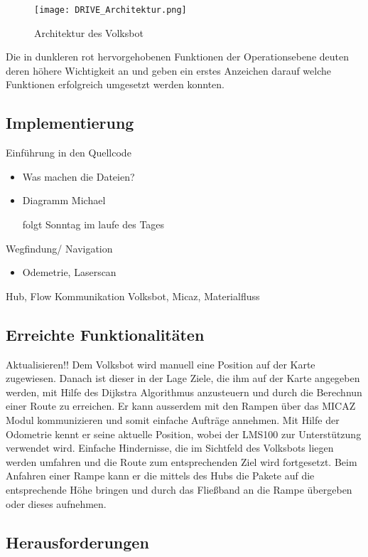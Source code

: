 \begin{figure}[h!]
 \centering
		\texttt{[image: DRIVE\_Architektur.png]}
	\caption{Architektur des Volksbot}
	\label{fig:architecture_volksbot}
\end{figure}

Die in dunkleren rot hervorgehobenen Funktionen der Operationsebene deuten deren höhere Wichtigkeit an und geben ein erstes Anzeichen darauf welche Funktionen erfolgreich umgesetzt werden konnten.

\subsection{Implementierung}
Einführung in den Quellcode
\begin{itemize}
\item Was machen die Dateien? 
\item Diagramm Michael

folgt Sonntag im laufe des Tages


\end{itemize}
Wegfindung/ Navigation
\begin{itemize}
\item Odemetrie, Laserscan
\end{itemize}
Hub, Flow
Kommunikation Volksbot, Micaz, Materialfluss

\subsection{Erreichte Funktionalitäten}

Aktualisieren!!
Dem Volksbot wird manuell eine Position auf der Karte zugewiesen. Danach ist dieser in der Lage Ziele, die ihm auf der Karte angegeben werden, mit Hilfe des Dijkstra Algorithmus anzusteuern und durch die Berechnun einer Route zu erreichen. Er kann ausserdem mit den Rampen über das MICAZ Modul kommunizieren und somit einfache Aufträge annehmen. Mit Hilfe der Odometrie kennt er seine aktuelle Position, wobei der LMS100 zur Unterstützung verwendet wird. Einfache Hindernisse, die im Sichtfeld des Volksbots liegen werden umfahren und die Route zum entsprechenden Ziel wird fortgesetzt. Beim Anfahren einer Rampe kann er die mittels des Hubs die Pakete auf die entsprechende Höhe bringen und durch das Fließband an die Rampe übergeben oder dieses aufnehmen.

\subsection{Herausforderungen}

